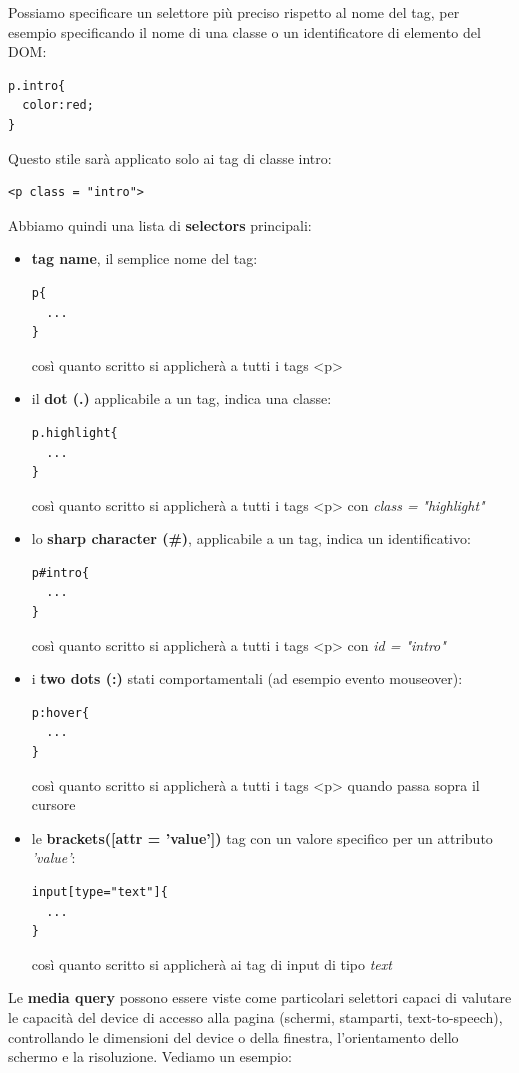 \documentclass[a4paper,12pt, oneside]{book}
\begin{document}
\newpage
Possiamo specificare un selettore più preciso rispetto al
nome del tag, per esempio specificando il nome di una
classe o un identificatore di elemento del DOM:
\begin{verbatim}
p.intro{
  color:red;
}
\end{verbatim}
Questo stile sarà applicato solo ai tag di classe intro:
\begin{verbatim}
<p class = "intro">
\end{verbatim}
Abbiamo quindi una lista di \textbf{selectors} principali:
\begin{itemize}
\item \textbf{tag name}, il semplice nome del tag:
\begin{verbatim}
p{
  ...
}
\end{verbatim}
così quanto scritto si applicherà a tutti i tags <p>
\item il \textbf{dot (.)} applicabile a un tag, indica una classe:
\begin{verbatim}
p.highlight{
  ...
}
\end{verbatim}
così quanto scritto si applicherà a tutti i tags <p> con \textit{class =} \textit{"highlight"}
\item lo \textbf{sharp character (\#)}, applicabile a un tag, indica un identificativo:
\begin{verbatim}
p#intro{
  ...
}
\end{verbatim}
così quanto scritto si applicherà a tutti i tags <p> con \textit{id = "intro"}
\item i \textbf{two dots (:)} stati comportamentali (ad esempio evento mouseover):
\begin{verbatim}
p:hover{
  ...
}
\end{verbatim}
così quanto scritto si applicherà a tutti i tags <p> quando passa sopra il cursore
\item le \textbf{brackets([attr = 'value'])} tag con un valore specifico per un attributo \textit{'value'}:
\begin{verbatim}
input[type="text"]{
  ...
}
\end{verbatim}
così quanto scritto si applicherà ai tag di input di tipo \textit{text}
\end{itemize}
Le \textbf{media query} possono essere viste come particolari selettori capaci di valutare le capacità del device di accesso alla pagina (schermi, stamparti, text-to-speech), controllando le dimensioni del device o della finestra, l'orientamento dello schermo e la risoluzione. Vediamo un esempio:\\
\end{document}
